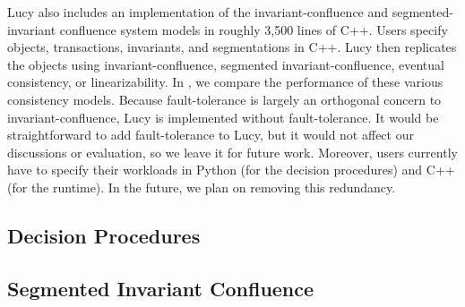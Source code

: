 Lucy also includes an implementation of the invariant-confluence and
segmented-invariant confluence system models in roughly 3,500 lines of C++.
Users specify objects, transactions, invariants, and segmentations in C++. Lucy
then replicates the objects using invariant-confluence, segmented
invariant-confluence, eventual consistency, or linearizability. In
, we compare the performance of these
various consistency models.
%
Because fault-tolerance is largely an orthogonal concern to
invariant-confluence, Lucy is implemented without fault-tolerance. It would be
straightforward to add fault-tolerance to Lucy, but it would not affect our
discussions or evaluation, so we leave it for future work. Moreover, users
currently have to specify their workloads in Python (for the decision
procedures) and C++ (for the runtime). In the future, we plan on removing this
redundancy.

\subsection{Decision Procedures}

\subsection{Segmented Invariant Confluence}


